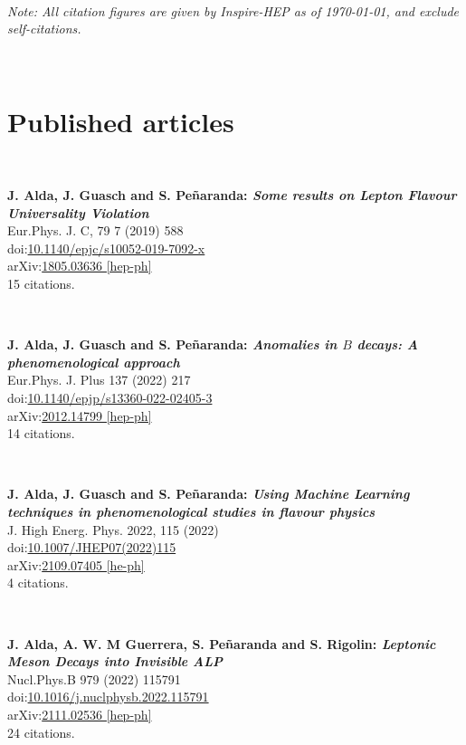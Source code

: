 \documentclass[12pt, a4paper]{article}
\begin{document}
\noindent{\LARGE \bf \textcolor{teal}{\sffamily List of publications by Jorge Alda}}

~

\textit{Note: All citation figures are given by Inspire-HEP as of \today, and exclude self-citations.}

~ 

\section{Published articles}

~

\textbf{J. Alda, J. Guasch and S. Peñaranda: \textit{Some results on Lepton Flavour Universality Violation}}\\
Eur.Phys. J. C, 79 7 (2019) 588\\
doi:\href{https://doi.org/10.1140/epjc/s10052-019-7092-x}{10.1140/epjc/s10052-019-7092-x}\\
arXiv:\href{https://arxiv.org/abs/1805.03636}{1805.03636 [hep-ph]}\\
15 citations.

~

\textbf{J. Alda, J. Guasch and S. Peñaranda: \textit{Anomalies in $B$ decays: A phenomenological approach}}\\
Eur.Phys. J. Plus 137 (2022) 217\\
doi:\href{https://doi.org/10.1140/epjp/s13360-022-02405-3}{10.1140/epjp/s13360-022-02405-3}\\
arXiv:\href{https://arxiv.org/abs/2012.14799}{2012.14799 [hep-ph]}\\
14 citations.

~


\textbf{J. Alda, J. Guasch and S. Peñaranda: \textit{Using Machine Learning techniques in phenomenological studies in flavour physics}}\\
J. High Energ. Phys. 2022, 115 (2022)\\
doi:\href{https://doi.org/10.1007/JHEP07(2022)115}{10.1007/JHEP07(2022)115}\\
arXiv:\href{https://arxiv.org/abs/2109.07405}{2109.07405 [he-ph]}\\
4 citations.



~

\textbf{J. Alda, A. W. M Guerrera, S. Peñaranda and S. Rigolin: \textit{Leptonic Meson Decays into Invisible ALP}}\\
Nucl.Phys.B 979 (2022) 115791\\
doi:\href{https://doi.org/10.1016/j.nuclphysb.2022.115791}{10.1016/j.nuclphysb.2022.115791}\\
arXiv:\href{https://arxiv.org/abs/2111.02536}{2111.02536 [hep-ph]}\\
24 citations.
\end{document}
